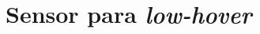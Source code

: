 \documentclass[main.tex]{subfiles}
\begin{document}





\section{Sensor para \textit{low-hover}}
\end{document}
